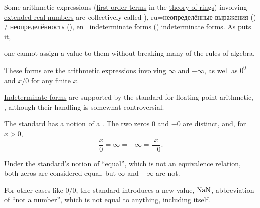 \begin{definition}\label{def:indeterminate_form}\mimprovised
  Some arithmetic expressions (\hyperref[def:first_order_syntax/term]{first-order terms} in the \hyperref[def:ring/theory]{theory of rings}) involving \hyperref[def:extended_real_numbers]{extended real numbers} are collectively called \term[bg=неопределености (\cite[228]{ИлинСадовничиСендов1984АнализТом1}), ru=неопределённые выражения (\cite[\S 41]{Фихтенгольц1968ОсновыАнализаТом1}) / неопределённость (\cite[235]{ИльинСадовничийСендов1985АнализТом1}), en=indeterminate forms (\cite[12]{Tao2011MeasureTheory})]{indeterminate forms}. As  puts it,
  \begin{displayquote}
    \textellipsis one cannot assign a value to them without breaking many of the rules of algebra.
  \end{displayquote}

  These forms are the arithmetic expressions involving \( \infty \) and \( -\infty \), as well as \( 0^0 \) and \( x / 0 \) for any finite \( x \).
\end{definition}

\begin{remark}\label{rem:floating_point_indeterminate_forms}
  \hyperref[def:indeterminate_form]{Indeterminate forms} are supported by the standard for floating-point arithmetic, \cite[31]{IEEE:754:2019}, although their handling is somewhat controversial.

  The standard has a notion of a . The two zeros \( 0 \) and \( -0 \) are distinct, and, for \( x > 0 \),
  \begin{equation*}
    \frac x 0 = \infty = -\infty = \frac x {-0}.
  \end{equation*}

  Under the standard's notion of \enquote{equal}, which is not an \hyperref[def:equivalence_relation]{equivalence relation}, both zeros are considered equal, but \( \infty \) and \( -\infty \) are not.

  For other cases like \( 0 / 0 \), the standard introduces a new value, \( \op{NaN} \), abbreviation of \enquote{not a number}, which is not equal to anything, including itself.
\end{remark}

